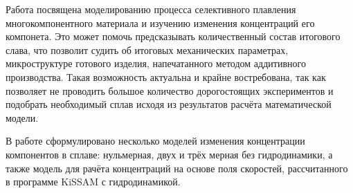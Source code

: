 
Работа посвящена моделированию процесса селективного плавления 
многокомпонентного материала и изучению изменения концентраций 
его компонета. Это может помочь предсказывать количественный 
состав итогового слава, что позволит судить об итоговых механических 
параметрах, микроструктуре готового изделия, напечатанного методом 
аддитивного производства. Такая возможность актуальна и крайне востребована, 
так как позволяет не проводить большое количество дорогостоящих экспериментов 
и подобрать необходимый сплав исходя из результатов расчёта математической модели.

В работе сформулировано несколько моделей изменения концентрации компонентов 
в сплаве: нульмерная, двух и трёх мерная без гидродинамики, а также модель для 
рачёта концентраций на основе поля скоростей, рассчитанного в программе KiSSAM 
с гидродинамикой.

    


\clearpage